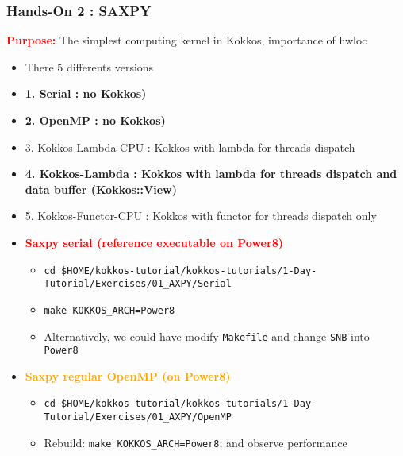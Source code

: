 \begin{frame}[fragile=singleslide]
  \frametitle{Hands-On 2 : SAXPY}

  {\large \textcolor{red}{\textbf{Purpose:}} The simplest computing kernel in Kokkos, importance of hwloc}

  \begin{itemize}
  \item There 5 differents versions
  \item \textbf{1. Serial : no Kokkos)}
  \item \textbf{2. OpenMP : no Kokkos)}
  \item 3. Kokkos-Lambda-CPU : Kokkos with lambda for threads dispatch
  \item \textbf{4. Kokkos-Lambda : Kokkos with lambda for threads dispatch and data buffer (Kokkos::View)}
  \item 5. Kokkos-Functor-CPU : Kokkos with functor for threads dispatch only
  \end{itemize}
  
  \begin{itemize}
  \item \textcolor{red}{\textbf{Saxpy serial (reference executable on Power8)}}
    \begin{itemize}
    \item \texttt{cd \$HOME/kokkos-tutorial/kokkos-tutorials/1-Day-Tutorial/Exercises/01\_AXPY/Serial}
    \item \texttt{make KOKKOS\_ARCH=Power8}
    \item Alternatively, we could have modify \texttt{Makefile} and change \texttt{SNB} into \texttt{Power8}
    \end{itemize}
  \item \textcolor{orange}{\textbf{Saxpy regular OpenMP (on Power8)}}
    \begin{itemize}
    \item \texttt{cd \$HOME/kokkos-tutorial/kokkos-tutorials/1-Day-Tutorial/Exercises/01\_AXPY/OpenMP}
    \item Rebuild: \texttt{make KOKKOS\_ARCH=Power8}; and observe performance
    \end{itemize}
  \end{itemize}

\end{frame}

